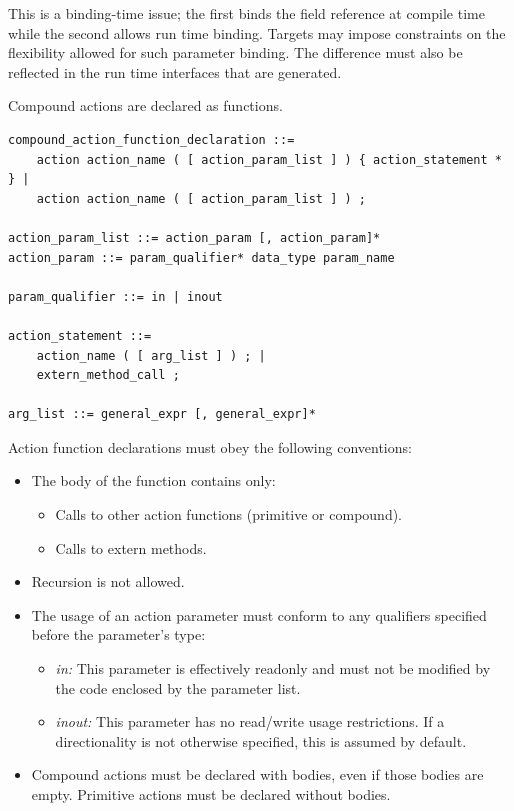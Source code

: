 \documentclass[12pt]{article}
\begin{document}
This is a binding-time issue; the first binds the field reference at compile 
time while the second allows run time binding. Targets may impose constraints 
on the flexibility allowed for such parameter binding. The difference must 
also be reflected in the run time interfaces that are generated.


Compound actions are declared as functions.

\begin{lstlisting}[style=BNFstyle]
compound_action_function_declaration ::=
    action action_name ( [ action_param_list ] ) { action_statement * } |
    action action_name ( [ action_param_list ] ) ;

action_param_list ::= action_param [, action_param]*
action_param ::= param_qualifier* data_type param_name

param_qualifier ::= in | inout

action_statement ::= 
    action_name ( [ arg_list ] ) ; |
    extern_method_call ;

arg_list ::= general_expr [, general_expr]*
\end{lstlisting}

Action function declarations must obey the following conventions:

\begin{itemize}
\item
The body of the function contains only:
\begin{itemize}
\item
Calls to other action functions (primitive or compound).
\item
Calls to extern methods.
\end{itemize}
\item
Recursion is not allowed.
\item
The usage of an action parameter must conform to any qualifiers specified
before the parameter's type:
\begin{itemize}
\item
\textit{in:} This parameter is effectively readonly and must not be modified
by the code enclosed by the parameter list.
\item
\textit{inout:} This parameter has no read/write usage restrictions. If a
directionality is not otherwise specified, this is assumed by default.
\end{itemize}
\item
Compound actions must be declared with bodies, even if those bodies are empty.
Primitive actions must be declared without bodies.
\end{itemize}
\end{document}
